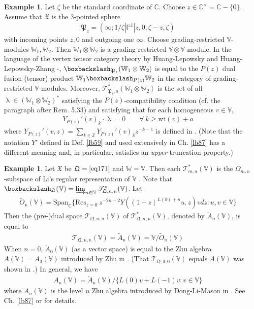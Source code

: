 \documentclass[11pt,b5paper,notitlepage]{article}
\theoremstyle{definition}
\newtheorem{eg}[df]{Example}
\theoremstyle{plain}
\newcommand{\fk}{\mathfrak}
\newcommand{\wtd}{\widetilde}
\newcommand{\Res}{\mathrm{Res}}
\newcommand{\Span}{\mathrm{Span}}
\newcommand{\scr}{\mathscr}
\newcommand{\Vbb}{\mathbb V}
\newcommand{\Wbb}{\mathbb W}
\newcommand{\Cbb}{\mathbb C}
\newcommand{\Nbb}{\mathbb N}
\newcommand{\Zbb}{\mathbb Z}
\newcommand{\Pbb}{\mathbb P}
\newcommand{\wt}{\mathrm{wt}}
\newcommand{\<}{\left\langle}
\renewcommand{\>}{\right\rangle}
\newcommand{\bbs}{\boxbackslash}
\newcommand{\fq}{{\mathfrak Q}}
\numberwithin{equation}{section}
\begin{document}
\begin{eg}
Let $\zeta$ be the standard coordinate of $\Cbb$. Choose $z\in\Cbb^\times=\Cbb-\{0\}$. Assume that $\fk X$ is the $3$-pointed sphere
\begin{align}
\fk P_z=(\infty;1/\zeta| \Pbb^1|z,0;\zeta-z,\zeta)
\end{align}
with incoming points $z,0$ and outgoing one $\infty$. Choose grading-restricted $\Vbb$-modules $\Wbb_1,\Wbb_2$. Then $\Wbb_1\otimes\Wbb_2$ is a grading-restricted $\Vbb\otimes\Vbb$-module. In the language of the vertex tensor category theory by Huang-Lepowsky \cite{HL-tensor-1,HL-tensor-2,HL-tensor-3,Hua-tensor-4} and Huang-Lepowsky-Zhang \cite{HLZ1,HLZ2}-\cite{HLZ8}, $\bbs_{\fk P_z}(\Wbb_1\otimes \Wbb_2)$ is equal to the $P(z)$ dual fusion (tensor) product $\Wbb_1\bbs_{P(z)}\Wbb_2$ in the category of grading-restricted $\Vbb$-modules. Moreover, $\scr T_{\fk P_z,a}^*(\Wbb_1\otimes\Wbb_2)$ is the set of all $\uplambda\in(\Wbb_1\otimes\Wbb_2)^*$ satisfying the $P(z)$-compatibility condition (cf. \cite[Sec. 5.2]{HLZ4} the paragraph after Rem. 5.33) and satisfying that for each homogeneous $v\in \Vbb$,
\begin{align}
Y_{P(z)}'(v)_k\cdot\uplambda=0\qquad\forall~k\geq\wt(v)+a
\end{align}
where $Y_{P(z)}'(v,z)=\sum_{k\in\Zbb}Y_{P(z)}'(v)_kz^{-k-1}$ is defined in \cite[Def. 5.3]{HLZ4}. (Note that the notation $Y'$ defined in Def. \ref{lb59} and used extensively in Ch. \ref{lb87} has a different meaning and, in particular, satisfies an \emph{upper} truncation property.)
\end{eg}



\begin{eg}\label{lb92}
Let $\fk X$ be $\fq=\eqref{eq171}$ and $\Wbb=\Vbb$. Then each $\scr T_{m,n}^*(\Vbb)$ is the $\Omega_{m,n}$-subspace of Li's regular representation of $\Vbb$ \cite{Li-regular-rep,LS-twisted-regular-rep}. Note that $\bbs_\fq(\Vbb)=\varinjlim_{n\in\Nbb}\scr T_{\fq,n,n}^*(\Vbb)$.  Let 
\begin{gather}
\wtd O_n(\Vbb)=\Span_\Cbb\big\{\Res_{z=0}~z^{-2n-2}Y((1+z)^{L(0)+n}u,z)vdz:u,v\in\Vbb  \big\}
\end{gather}
Then the (pre-)dual space $\scr T_{\fq,n,n}(\Vbb)$ of $\scr T_{\fq,n,n}^*(\Vbb)$, denoted by $\wtd A_n(\Vbb)$, is equal to
\begin{gather}
\scr T_{\fq,n,n}(\Vbb)=\wtd A_n(\Vbb)=\Vbb/\wtd O_n(\Vbb)
\end{gather}
When $n=0$, $\wtd A_0(\Vbb)$ (as a vector space) is equal to the Zhu algebra $A(\Vbb)=A_0(\Vbb)$ introduced by Zhu in \cite{Zhu-modular-invariance}. (That $\scr T_{\fq,0,0}(\Vbb)$ equals $A(\Vbb)$ was shown in \cite[Prop. 7.2.2 and A.2.7]{NT-P1_conformal_blocks}.) In general, we have
\begin{align}
A_n(\Vbb)=\wtd A_n(\Vbb)/\{L(0)v+L(-1)v:v\in\Vbb\}
\end{align}
where $A_n(\Vbb)$ is the level $n$ Zhu algebra introduced by Dong-Li-Mason in \cite{DLM-Zhu}. See Ch. \ref{lb87} or \cite{Li-regular-AnV,Li-regular-bimodules} for details.
\end{eg}
\end{document}
